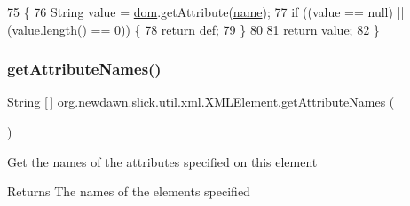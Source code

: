 \begin{DoxyCode}
75                                                         \{
76         String value = \mbox{\hyperlink{classorg_1_1newdawn_1_1slick_1_1util_1_1xml_1_1_x_m_l_element_a97e3ba0c57e0822e9111fd770807e64e}{dom}}.getAttribute(\mbox{\hyperlink{classorg_1_1newdawn_1_1slick_1_1util_1_1xml_1_1_x_m_l_element_aa96123a88e2614952c4d3d1a4207560a}{name}});
77         \textcolor{keywordflow}{if} ((value == null) || (value.length() == 0)) \{
78             \textcolor{keywordflow}{return} def;
79         \}
80         
81         \textcolor{keywordflow}{return} value;
82     \}
\end{DoxyCode}
\mbox{\label{classorg_1_1newdawn_1_1slick_1_1util_1_1xml_1_1_x_m_l_element_a094548131938fb0ede3ab450846251f9}} 
\subsubsection{\texorpdfstring{get\+Attribute\+Names()}{getAttributeNames()}}
{\footnotesize\ttfamily String \mbox{[}$\,$\mbox{]} org.\+newdawn.\+slick.\+util.\+xml.\+X\+M\+L\+Element.\+get\+Attribute\+Names (\begin{DoxyParamCaption}{ }\end{DoxyParamCaption})\hspace{0.3cm}{\ttfamily [inline]}}

Get the names of the attributes specified on this element

\begin{DoxyReturn}{Returns}
The names of the elements specified 
\end{DoxyReturn}

